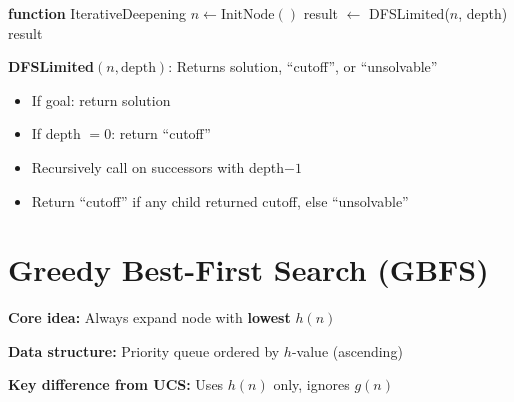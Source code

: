 \documentclass[11pt,a4paper]{article}
\begin{document}
\begin{examplebox}
\begin{algorithmic}
\STATE \textbf{function} IterativeDeepening
\STATE $n \gets \text{InitNode}()$
    \STATE result $\gets$ DFSLimited($n$, depth)
        \RETURN result
    \ENDIF
\ENDFOR
\end{algorithmic}

\vspace{0.5em}
\textbf{DFSLimited}$(n, \text{depth})$: Returns solution, ``cutoff'', or ``unsolvable''
\begin{itemize}[leftmargin=*,nosep]
\item If goal: return solution
\item If depth $= 0$: return ``cutoff''
\item Recursively call on successors with depth$-1$
\item Return ``cutoff'' if any child returned cutoff, else ``unsolvable''
\end{itemize}
\end{examplebox}

\section{Greedy Best-First Search (GBFS)}

\begin{definitionbox}
\textbf{Core idea:} Always expand node with \textbf{lowest} $h(n)$

\textbf{Data structure:} Priority queue ordered by $h$-value (ascending)

\textbf{Key difference from UCS:} Uses $h(n)$ only, ignores $g(n)$
\end{definitionbox}
\end{document}
